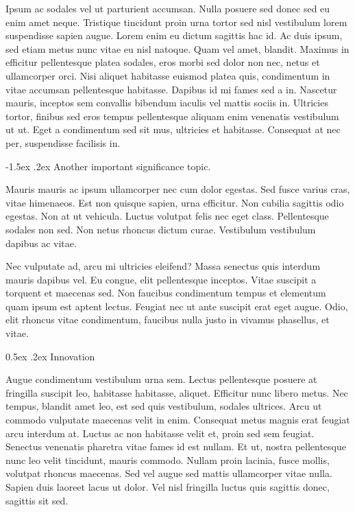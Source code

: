 \documentclass[11pt,]{article}
\makeatletter
\renewcommand\subsection{
  \@startsection{subsection}{2}{\z@}
    {-1.5ex\@plus -1ex \@minus -.2ex}%
    {0.5ex \@plus .2ex}%
    {\normalfont\normalsize\bf}} %
\renewcommand\paragraph{
  \@startsection{paragraph}{4}{\z@}
    {-1.0ex\@plus -1ex \@minus -.2ex}%
    {-1.5ex \@plus .2ex}%
    {\normalfont\normalsize\bf}} %
\makeatother
\begin{document}
Ipsum ac sodales vel ut parturient accumsan. Nulla posuere sed donec sed
eu enim amet neque. Tristique tincidunt proin urna tortor sed nisl
vestibulum lorem suspendisse sapien augue. Lorem enim eu dictum sagittis
hac id. Ac duis ipsum, sed etiam metus nunc vitae eu nisl natoque. Quam
vel amet, blandit. Maximus in efficitur pellentesque platea sodales,
eros morbi sed dolor non nec, netus et ullamcorper orci. Nisi aliquet
habitasse euismod platea quis, condimentum in vitae accumsan
pellentesque habitasse. Dapibus id mi fames sed a in. Nascetur mauris,
inceptos sem convallis bibendum iaculis vel mattis sociis in. Ultricies
tortor, finibus sed eros tempus pellentesque aliquam enim venenatis
vestibulum ut ut. Eget a condimentum sed sit mus, ultricies et
habitasse. Consequat at nec per, suspendisse facilisis in.

\hypertarget{another-important-significance-topic.}{%
\paragraph{Another important significance
topic.}\label{another-important-significance-topic.}}

Mauris mauris ac ipsum ullamcorper nec cum dolor egestas. Sed fusce
varius cras, vitae himenaeos. Est non quisque sapien, urna efficitur.
Non cubilia sagittis odio egestas. Non at ut vehicula. Luctus volutpat
felis nec eget class. Pellentesque sodales non sed. Non netus rhoncus
dictum curae. Vestibulum vestibulum dapibus ac vitae.

Nec vulputate ad, arcu mi ultricies eleifend? Massa senectus quis
interdum mauris dapibus vel. Eu congue, elit pellentesque inceptos.
Vitae suscipit a torquent et maecenas sed. Non faucibus condimentum
tempus et elementum quam ipsum est aptent lectus. Feugiat nec ut ante
suscipit erat eget augue. Odio, elit rhoncus vitae condimentum, faucibus
nulla justo in vivamus phasellus, et vitae.

\hypertarget{innovation}{%
\subsection{Innovation}\label{innovation}}

Augue condimentum vestibulum urna sem. Lectus pellentesque posuere at
fringilla suscipit leo, habitasse habitasse, aliquet. Efficitur nunc
libero metus. Nec tempus, blandit amet leo, est sed quis vestibulum,
sodales ultrices. Arcu ut commodo vulputate maecenas velit in enim.
Consequat metus magnis erat feugiat arcu interdum at. Luctus ac non
habitasse velit et, proin sed sem feugiat. Senectus venenatis pharetra
vitae fames id est nullam. Et ut, nostra pellentesque nunc leo velit
tincidunt, mauris commodo. Nullam proin lacinia, fusce mollis, volutpat
rhoncus maecenas. Sed vel augue sed mattis ullamcorper vitae nulla.
Sapien duis laoreet lacus ut dolor. Vel nisl fringilla luctus quis
sagittis donec, sagittis sit sed.
\end{document}
